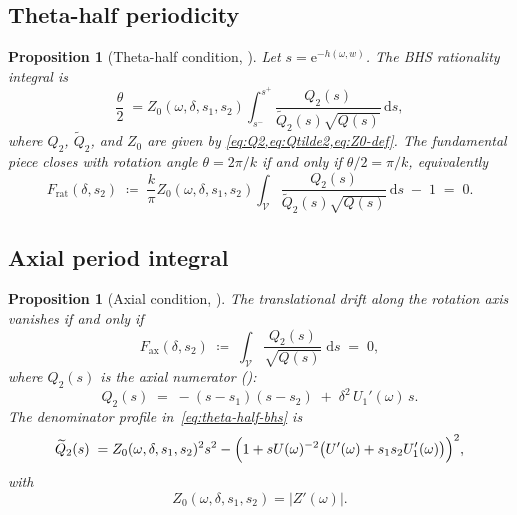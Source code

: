 \documentclass[11pt,a4paper]{article}
\theoremstyle{plain}
\newtheorem{proposition}[theorem]{Proposition}
\theoremstyle{definition}
\theoremstyle{remark}
\newcommand{\dd}{\mathrm{d}}
\newcommand{\ee}{\mathrm{e}}
\begin{document}
\subsection{Theta-half periodicity}\label{sec:theta-half}

\begin{proposition}[Theta-half condition,
  {\cite[Eq.~82]{BHS25}}]
\label{prop:theta-half}
Let $s = \ee^{-h(\omega,w)}$.  The BHS rationality integral is
\begin{equation}
  \frac{\theta}{2}
  \;=
  Z_0(\omega,\delta,s_1,s_2)
  \int_{s^-}^{s^+}
    \frac{Q_2(s)}{\widetilde Q_2(s)\sqrt{Q(s)}}\,\dd s,
  \label{eq:theta-half-bhs}
\end{equation}
where $Q_2$, $\widetilde Q_2$, and $Z_0$ are given by
\cref{eq:Q2,eq:Qtilde2,eq:Z0-def}.  The fundamental piece closes with
rotation angle $\theta = 2\pi/k$ if and only if $\theta/2 = \pi/k$,
equivalently
\begin{equation}
  F_{\mathrm{rat}}(\delta,s_2)
  \;\coloneqq\;
  \frac{k}{\pi}
  Z_0(\omega,\delta,s_1,s_2)
  \int_{\mathcal V}
    \frac{Q_2(s)}{\widetilde Q_2(s)\sqrt{Q(s)}}\,\dd s
  \;-\; 1
  \;=\; 0.
  \label{eq:F-rat}
\end{equation}
\end{proposition}

\subsection{Axial period integral}\label{sec:axial}

\begin{proposition}[Axial condition,
  {\cite[Eq.~83]{BHS25}}]
\label{prop:axial}
The translational drift along the rotation axis vanishes if and only if
\begin{equation}
  F_{\mathrm{ax}}(\delta,s_2)
  \;\coloneqq\;
  \int_{\mathcal{V}}
    \frac{Q_2(s)}{\sqrt{Q(s)}} \;\dd s
  \;=\; 0,
  \label{eq:F-ax}
\end{equation}
where $Q_2(s)$ is the axial numerator
(\cite[Eq.~86]{BHS25}):
\begin{equation}
  Q_2(s) \;=\; -(s - s_1)(s - s_2)
    \;+\; \delta^2\,U_1'(\omega)\,s.
  \label{eq:Q2}
\end{equation}
The denominator profile in~\eqref{eq:theta-half-bhs} is
\cite[Eq.~87]{BHS25}
\begin{equation}
  \widetilde Q_2(s)
  \;=
  Z_0(\omega,\delta,s_1,s_2)^2 s^2
  - \Bigl(1 + sU(\omega)^{-2}\bigl(U'(\omega)+s_1s_2U_1'(\omega)\bigr)\Bigr)^2,
  \label{eq:Qtilde2}
\end{equation}
with
\begin{equation}
  Z_0(\omega,\delta,s_1,s_2)=|Z'(\omega)|.
  \label{eq:Z0-def}
\end{equation}
\end{proposition}
\end{document}

